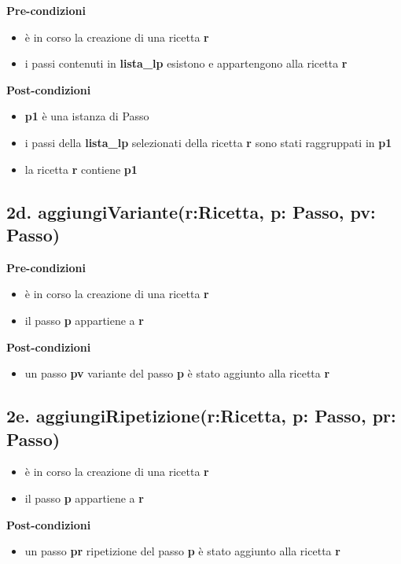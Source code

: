\documentclass[12pt]{extarticle}
\begin{document}
\textbf{Pre-condizioni}
\begin{itemize}
  \item è in corso la creazione di una ricetta  \textbf{r}
  \item i passi contenuti in \textbf{lista\_lp} esistono e appartengono alla ricetta \textbf{r}
\end{itemize}
\textbf{Post-condizioni}
\begin{itemize}
  \item \textbf{p1} è una istanza di Passo
  \item i passi della \textbf{lista\_lp} selezionati della ricetta  \textbf{r} sono stati raggruppati in \textbf{p1}
  \item  la ricetta \textbf{r} contiene  \textbf{p1}
\end{itemize}

\subsection*{2d. aggiungiVariante(r:Ricetta, p: Passo, pv: Passo)}

\textbf{Pre-condizioni}
\begin{itemize}
  \item è in corso la creazione di una ricetta  \textbf{r}
  \item il passo \textbf{p} appartiene a \textbf{r}
\end{itemize}
\textbf{Post-condizioni}
\begin{itemize}
  \item un passo  \textbf{pv} variante del passo  \textbf{p} è stato aggiunto alla ricetta  \textbf{r}
\end{itemize}

\subsection*{2e. aggiungiRipetizione(r:Ricetta, p: Passo, pr: Passo)}
\begin{itemize}
  \item è in corso la creazione di una ricetta  \textbf{r}
  \item il passo \textbf{p} appartiene a \textbf{r}
\end{itemize}
\textbf{Post-condizioni}
\begin{itemize}
  \item un passo  \textbf{pr} ripetizione del passo  \textbf{p} è stato aggiunto alla ricetta  \textbf{r}
\end{itemize}
\end{document}
